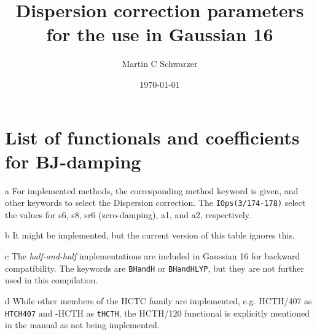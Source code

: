 \documentclass[   %
  final,          %
  a4paper,        %
  8pt
]{extarticle}
\title{Dispersion correction parameters for the use in Gaussian 16}
\author{Martin C Schwarzer}
\date{\today}
\begin{document}
\section{List of functionals and coefficients for BJ-damping\texorpdfstring{\cite{Grimme2017}}{}}
\begin{ThreePartTable}
  \begin{TableNotes}
  \footnotesize
\item [a] For implemented methods, the corresponding method keyword is given, and 
  other keywords to select the Dispersion correction.
  The \texttt{IOps(3/174-178)} select the values for s6, s8, sr6 (zero-damping), a1, and a2, respectively.
\item [b] It might be implemented, but the current version of this table ignores this.
\item [c] The \emph{half-and-half} implementations are included in Gaussian 16 for backward compatibility.\cite{Gaussian2016}
  The keywords are \texttt{BHandH} or \texttt{BHandHLYP}, but they are not further used in this compilation.
\item [d] While other members of the HCTC family are implemented, e.g. HCTH/407 as \texttt{HTCH407} 
  and \texttau-HCTH as \texttt{tHCTH}, the HCTH/120 functional is explicitly mentioned in the manual\cite{Gaussian2016}
  as not being implemented.
  \end{TableNotes}


\end{ThreePartTable}
\end{document}
